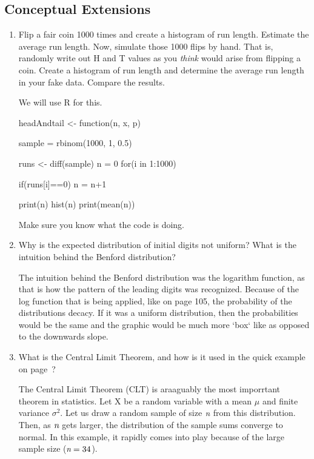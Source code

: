 \subsection*{Conceptual Extensions}
\begin{enumerate}

 \item Flip a fair coin 1000 times and create a histogram of run length. Estimate the average run length. Now, simulate those 1000 flips by hand. That is, randomly write out H and T values as you \emph{think} would arise from flipping a coin. Create a histogram of run length and determine the average run length in your fake data. Compare the results.
\begin{solution}
We will use R for this. 
\begin{codein}

headAndtail <- function(n, x, p){

  sample = rbinom(1000, 1, 0.5)

  runs <- diff(sample)
  n = 0
  for(i in 1:1000){
    if(runs[i]==0){
      n = n+1
    }
    
  }
  print(n)
  hist(n)
  print(mean(n))
}
\end{codein}
Make sure you know what the code is doing.
\end{solution}

 \item Why is the expected distribution of initial digits not uniform? What is the intuition behind the Benford distribution?
\begin{solution}
The intuition behind the Benford distribution was the logarithm function, as that is how the pattern of the leading digits was recognized. Because of the log function that is being applied, like on page 105, the probability of the distributions decacy. If it was a uniform distribution, then the probabilities would be the same and the graphic would be much more `box` like as opposed to the downwards slope.
\end{solution}

 \item What is the Central Limit Theorem, and how is it used in the quick example on page~\pageref{ex:digitTests-firstExample}?
\begin{solution}
The Central Limit Theorem (CLT) is araaguably the most imporrtant theorem in statistics. Let X  be a random variable with a mean $\mu$ and finite variance $\sigma^{2}$. Let us draw a random sample of size $\emph{n}$ from this distribution. Then, as $\emph{n}$ gets larger, the distribution of the sample sums converge to normal. In this example, it rapidly comes into play because of the large sample size ($\emph{n} = 34$).
\end{solution}


\end{enumerate}

